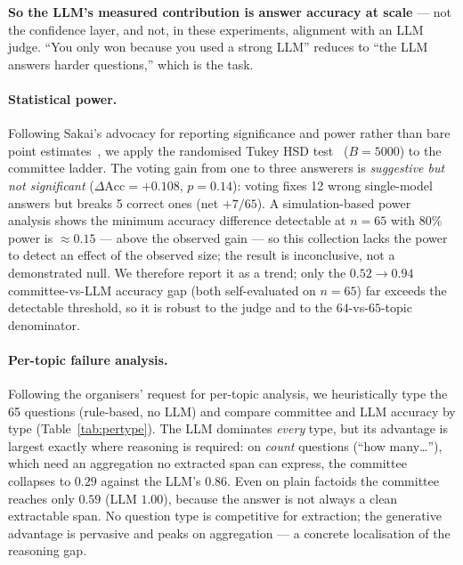 \documentclass[sigconf,nonacm]{acmart}
\begin{document}
\textbf{So the LLM's measured contribution is answer accuracy at scale} --- not the
confidence layer, and not, in these experiments, alignment with an LLM judge. ``You only won because you
used a strong LLM'' reduces to ``the LLM answers harder questions,'' which is the
task.

\paragraph{Statistical power.} Following Sakai's advocacy for reporting significance
and power rather than bare point estimates~\cite{sakai-reform,sakai-sigtest}, we
apply the randomised Tukey HSD test~\cite{sakai-sigtest} ($B{=}5000$) to the committee
ladder. The voting gain from one to three answerers is \emph{suggestive but not
significant} ($\Delta\text{Acc}{=}{+}0.108$, $p{=}0.14$): voting fixes 12 wrong
single-model answers but breaks 5 correct ones (net ${+}7/65$). A simulation-based
power analysis shows the minimum accuracy difference detectable at $n{=}65$ with
$80\%$ power is $\approx0.15$ --- above the observed gain --- so this collection lacks the
power to detect an effect of the observed size; the result is inconclusive, not a
demonstrated null. We therefore report it as a trend; only the $0.52\!\to\!0.94$
committee-vs-LLM accuracy gap (both self-evaluated on $n{=}65$) far exceeds the detectable
threshold, so it is robust to the judge and to the $64$-vs-$65$-topic denominator.

\paragraph{Per-topic failure analysis.} Following the organisers' request for
per-topic analysis, we heuristically type the 65 questions (rule-based, no LLM) and
compare committee and LLM accuracy by type (Table~\ref{tab:pertype}). The LLM
dominates \emph{every} type, but its advantage is largest exactly where reasoning is
required: on \emph{count} questions (``how many\ldots''), which need an aggregation
no extracted span can express, the committee collapses to $0.29$ against the LLM's
$0.86$. Even on plain factoids the committee reaches only $0.59$ (LLM $1.00$),
because the answer is not always a clean extractable span. No question type is
competitive for extraction; the generative advantage is pervasive and peaks on
aggregation --- a concrete localisation of the reasoning gap.
\end{document}
